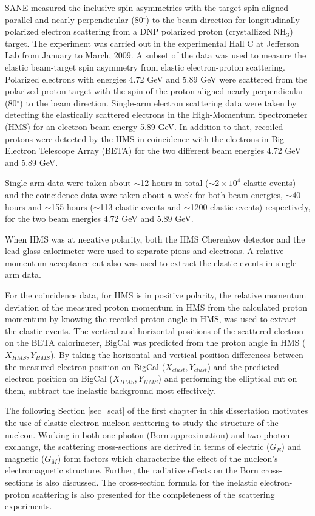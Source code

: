 SANE measured the inclusive spin asymmetries with the target spin aligned parallel and nearly perpendicular (80$^{\circ}$) to the beam direction for longitudinally polarized electron scattering from a DNP polarized proton (crystallized NH$_3$) target. The experiment was carried out in the experimental Hall C at Jefferson Lab from January to March, 2009. A subset of the data was used to measure the elastic beam-target spin asymmetry from elastic electron-proton scattering. Polarized electrons with energies 4.72 GeV and 5.89 GeV were scattered from the polarized proton target with the spin of the proton aligned nearly perpendicular (80$^{\circ}$) to the beam direction. Single-arm electron scattering data were taken by detecting the elastically scattered electrons in the High-Momentum Spectrometer (HMS) for an electron beam energy 5.89 GeV. In addition to that, recoiled protons were detected by the  HMS in coincidence with the electrons in Big Electron Telescope Array (BETA) for the two different beam energies 4.72 GeV and 5.89 GeV.

Single-arm data were taken about $\sim$12 hours in total ($\sim 2 \times 10^4$ elastic events) and the coincidence data were taken about a week for both beam energies, $\sim$40 hours and $\sim$155 hours ($\sim$113 elastic events and $\sim$1200 elastic events) respectively, for the two beam energies 4.72 GeV and 5.89 GeV. 

When HMS was at negative polarity, both the HMS Cherenkov detector and the lead-glass calorimeter were used to separate pions and electrons. A relative momentum acceptance cut also was used to extract the elastic events in single-arm data. 

For the coincidence data, for HMS is in positive polarity, the relative momentum deviation of the measured proton momentum in HMS from the calculated proton momentum by knowing the recoiled proton angle in HMS, was used to extract the elastic events. The vertical and horizontal positions of the scattered electron on the BETA calorimeter, BigCal was predicted from the proton angle in HMS ($X_{HMS}, Y_{HMS}$). By taking the horizontal and vertical position differences between the measured electron position on BigCal ($X_{clust}, Y_{clust}$) and the predicted electron position on BigCal ($X_{HMS}, Y_{HMS}$) and performing the elliptical cut on them, subtract the inelastic background most effectively.  

The following Section \ref{sec_scat} of the first chapter in this dissertation motivates the use of elastic electron-nucleon scattering to study the structure of the nucleon. Working in both one-photon (Born approximation) and two-photon exchange, the scattering cross-sections are derived in terms of electric ($G_E$) and magnetic ($G_M$) form factors which characterize the effect of the nucleon's electromagnetic structure. Further, the radiative effects on the Born cross-sections is also discussed. The cross-section formula for the inelastic electron-proton scattering is also presented for the completeness of the scattering experiments. 

